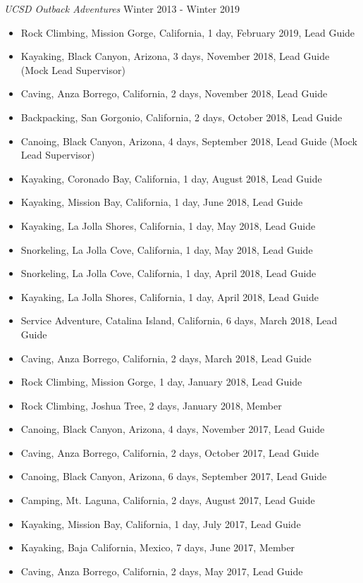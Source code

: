 \documentclass[line,margin]{res}
\begin{document}
\begin{resume}
	{\sl UCSD Outback Adventures} \hfill Winter 2013 - Winter 2019
	\begin{itemize}
		\item Rock Climbing, Mission Gorge, California, 1 day, February 2019, Lead Guide
		\item Kayaking, Black Canyon, Arizona, 3 days, November 2018, Lead Guide (Mock Lead Supervisor)
		\item Caving, Anza Borrego, California, 2 days, November 2018, Lead Guide
		\item Backpacking, San Gorgonio, California, 2 days, October 2018, Lead Guide
		\item Canoing, Black Canyon, Arizona, 4 days, September 2018, Lead Guide (Mock Lead Supervisor)
		\item Kayaking, Coronado Bay, California, 1 day, August 2018, Lead Guide
		\item Kayaking, Mission Bay, California, 1 day, June 2018, Lead Guide
		\item Kayaking, La Jolla Shores, California, 1 day, May 2018, Lead Guide
		\item Snorkeling, La Jolla Cove, California, 1 day, May 2018, Lead Guide
		\item Snorkeling, La Jolla Cove, California, 1 day, April 2018, Lead Guide
		\item Kayaking, La Jolla Shores, California, 1 day, April 2018, Lead Guide
		\item Service Adventure, Catalina Island, California, 6 days, March 2018, Lead Guide
		\item Caving, Anza Borrego, California, 2 days, March 2018, Lead Guide
		\item Rock Climbing, Mission Gorge, 1 day, January 2018, Lead Guide
		\item Rock Climbing, Joshua Tree, 2 days, January 2018, Member
		\item Canoing, Black Canyon, Arizona, 4 days, November 2017, Lead Guide
		\item Caving, Anza Borrego, California, 2 days, October 2017, Lead Guide
		\item Canoing, Black Canyon, Arizona, 6 days, September 2017, Lead Guide
		\item Camping, Mt. Laguna, California, 2 days, August 2017, Lead Guide
		\item Kayaking, Mission Bay, California, 1 day, July 2017, Lead Guide
		\item Kayaking, Baja California, Mexico, 7 days, June 2017, Member
		\item Caving, Anza Borrego, California, 2 days, May 2017, Lead Guide

\end{itemize}
\end{resume}
\end{document}
